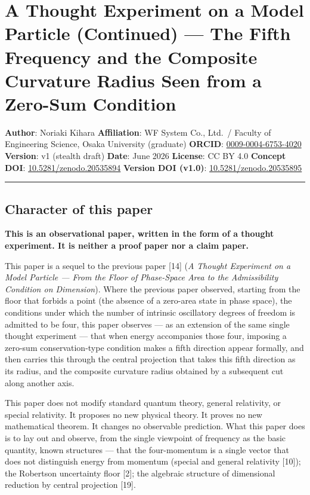 \documentclass[
]{article}
\author{}
\date{}
\begin{document}
\section{A Thought Experiment on a Model Particle (Continued) --- The
Fifth Frequency and the Composite Curvature Radius Seen from a Zero-Sum
Condition}\label{a-thought-experiment-on-a-model-particle-continued-the-fifth-frequency-and-the-composite-curvature-radius-seen-from-a-zero-sum-condition}

\textbf{Author}: Noriaki Kihara \textbf{Affiliation}: WF System Co.,
Ltd.~/ Faculty of Engineering Science, Osaka University (graduate)
\textbf{ORCID}:
\href{https://orcid.org/0009-0004-6753-4020}{0009-0004-6753-4020}
\textbf{Version}: v1 (stealth draft) \textbf{Date}: June 2026
\textbf{License}: CC BY 4.0 \textbf{Concept DOI}:
\href{https://doi.org/10.5281/zenodo.20535894}{10.5281/zenodo.20535894}
\textbf{Version DOI (v1.0)}:
\href{https://doi.org/10.5281/zenodo.20535895}{10.5281/zenodo.20535895}

\begin{center}\rule{0.5\linewidth}{0.5pt}\end{center}

\subsection{Character of this paper}\label{character-of-this-paper}

\textbf{This is an observational paper, written in the form of a thought
experiment. It is neither a proof paper nor a claim paper.}

This paper is a sequel to the previous paper {[}14{]} (\emph{A Thought
Experiment on a Model Particle --- From the Floor of Phase-Space Area to
the Admissibility Condition on Dimension}). Where the previous paper
observed, starting from the floor that forbids a point (the absence of a
zero-area state in phase space), the conditions under which the number
of intrinsic oscillatory degrees of freedom is admitted to be four, this
paper observes --- as an extension of the same single thought experiment
--- that when energy accompanies those four, imposing a zero-sum
conservation-type condition makes a fifth direction appear formally, and
then carries this through the central projection that takes this fifth
direction as its radius, and the composite curvature radius obtained by
a subsequent cut along another axis.

This paper does not modify standard quantum theory, general relativity,
or special relativity. It proposes no new physical theory. It proves no
new mathematical theorem. It changes no observable prediction. What this
paper does is to lay out and observe, from the single viewpoint of
frequency as the basic quantity, known structures --- that the
four-momentum is a single vector that does not distinguish energy from
momentum (special and general relativity {[}10{]}); the Robertson
uncertainty floor {[}2{]}; the algebraic structure of dimensional
reduction by central projection {[}19{]}.
\end{document}
